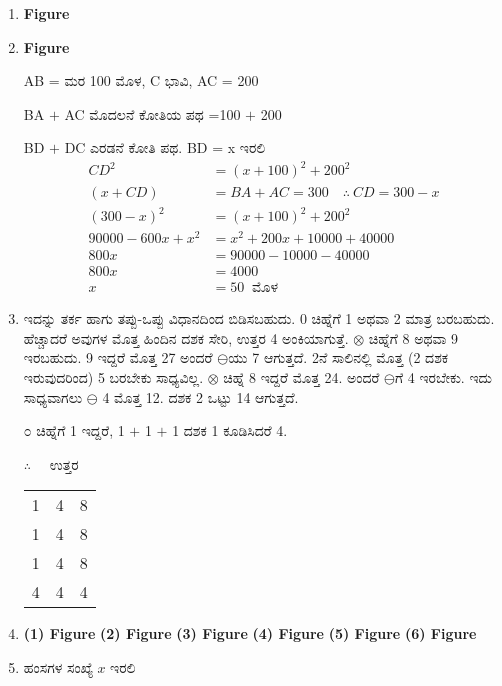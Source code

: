 \begin{enumerate}
\item 
\begin{center}
{\bf Figure}
\end{center}

\item 
\begin{center}
{\bf Figure}
\end{center}

AB =  ಮರ 100 ಮೊಳ, C ಭಾವಿ, AC = 200

BA $+$ AC ಮೊದಲನೆ ಕೋತಿಯ ಪಥ =100 $+$ 200

BD $+$ DC ಎರಡನೆ ಕೋತಿ ಪಥ. BD = x ಇರಲಿ 
\begin{align*}
CD^{2} & = (x + 100)^{2} + 200^{2}\\
(x+CD) & = BA + AC = 300 \quad\therefore~ CD = 300 - x\\
(300 - x)^{2} & = (x + 100)^{2} + 200^{2}\\
90000 - 600x + x^{2} & = x^{2} + 200x + 10000 + 40000\\
800x & = 90000 - 10000 - 40000\\
800x & = 4000\\
x & = 50 ~\text{ ಮೊಳ}
\end{align*}

\item ಇದನ್ನು ತರ್ಕ ಹಾಗು ತಪ್ಪು-ಒಪ್ಪು ವಿಧಾನದಿಂದ ಬಿಡಿಸಬಹುದು. 0 ಚಿಹ್ನೆಗೆ 1 ಅಥವಾ 2 ಮಾತ್ರ ಬರಬಹುದು. ಹೆಚ್ಚಾದರೆ ಅವುಗಳ ಮೊತ್ತ ಹಿಂದಿನ ದಶಕ ಸೇರಿ, ಉತ್ತರ 4 ಅಂಕಿಯಾಗುತ್ತೆ. $\otimes$ ಚಿಹ್ನೆಗೆ 8 ಅಥವಾ 9 ಇರಬಹುದು. 9 ಇದ್ದರೆ ಮೊತ್ತ 27 ಅಂದರೆ $\ominus$ಯು 7 ಆಗುತ್ತದೆ. 2ನೆ ಸಾಲಿನಲ್ಲಿ ಮೊತ್ತ (2 ದಶಕ ಇರುವುದರಿಂದ) 5 ಬರಬೇಕು ಸಾಧ್ಯವಿಲ್ಲ. $\otimes$ ಚಿಹ್ನೆ 8 ಇದ್ದರೆ ಮೊತ್ತ 24. ಅಂದರೆ $\ominus$ಗೆ 4 ಇರಬೇಕು. ಇದು ಸಾಧ್ಯವಾಗಲು $\ominus$ 4 ಮೊತ್ತ 12. ದಶಕ 2 ಒಟ್ಟು 14 ಆಗುತ್ತದೆ. 

೦ ಚಿಹ್ನೆಗೆ 1 ಇದ್ದರೆ, 1 $+$ 1 $+$ 1 ದಶಕ 1 ಕೂಡಿಸಿದರೆ 4. 

$\therefore\quad$ ಉತ್ತರ
\begin{tabular}[t]{lll}
1 & 4 & 8\\
1 & 4 & 8\\
1 & 4 & 8\\
\hline
4 & 4 & 4\\
\end{tabular}

\item 
\begin{center}
{\bf (1) Figure}
{\bf (2) Figure}
{\bf (3) Figure}
{\bf (4) Figure}
{\bf (5) Figure}
{\bf (6) Figure}
\end{center}

\item ಹಂಸಗಳ ಸಂಖ್ಯೆ $x$ ಇರಲಿ 


\end{enumerate}
